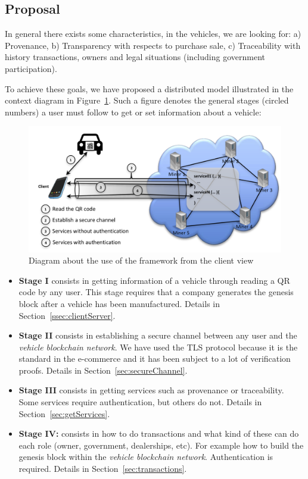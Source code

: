 \subsection{Proposal}
\label{subsec:proposal}
In general there exists some characteristics, in the vehicles, we are looking for:
a) Provenance,
b) Transparency with respects to purchase sale,
c) Traceability with history transactions, owners and legal situations (including  
government participation).

To achieve these goals, we have proposed a distributed model illustrated in the context
diagram in Figure~\ref{fig:flowChartFramework}. Such a figure denotes
the general stages (circled numbers) a user must follow to get or set information about a 
vehicle:
\begin{figure}[hb]
  \centering
    \includegraphics[scale=0.74]{images/lopez2.png}
        \caption{Diagram about the use of the framework from the client view}
    \label{fig:flowChartFramework}
\end{figure}

\begin{itemize}
  \item \textbf{Stage I} consists in getting information of a vehicle through reading
    a QR code by any user.
    This stage requires that a company generates the genesis block after a vehicle has 
    been manufactured. Details in Section~\ref{ssec:clientServer}.
  \item \textbf{Stage II} consists in establishing a secure channel between any user
    and the \textit{vehicle blockchain network}. We
    have used the TLS protocol because it is the standard in the
    e-commerce and it has been subject to a lot of verification proofs.
    Details in Section~\ref{sec:secureChannel}.
  \item \textbf{Stage III} consists in getting services such as provenance or 
    traceability. Some services require authentication, but others do not.
    Details in Section~\ref{sec:getServices}.  
  \item \textbf{Stage IV:} consists in how to do transactions and what kind of these can 
    do each role (owner, government, dealerships, etc). For example how to build
    the genesis block within the \textit{vehicle blockchain network}. 
    Authentication is required. 
    Details in Section~\ref{sec:transactions}. 
\end{itemize}


